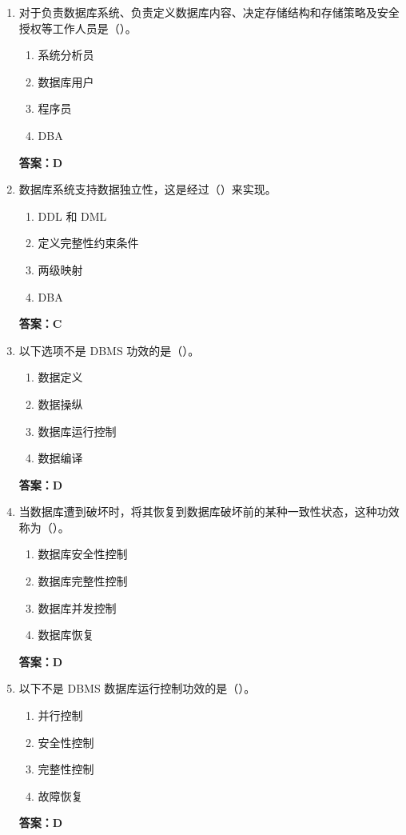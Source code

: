 \documentclass[12pt, a4paper]{article}
\begin{document}
\begin{enumerate}[label=\arabic*.]
	\item 对于负责数据库系统、负责定义数据库内容、决定存储结构和存储策略及安全授权等工作人员是（\quad）。
	      \begin{enumerate}
		      \item 系统分析员
		      \item 数据库用户
		      \item 程序员
		      \item DBA
	      \end{enumerate}
	      \textbf{答案：D}

	\item 数据库系统支持数据独立性，这是经过（\quad）来实现。
	      \begin{enumerate}
		      \item DDL 和 DML
		      \item 定义完整性约束条件
		      \item 两级映射
		      \item DBA
	      \end{enumerate}
	      \textbf{答案：C}

	\item 以下选项不是 DBMS 功效的是（\quad）。
	      \begin{enumerate}
		      \item 数据定义
		      \item 数据操纵
		      \item 数据库运行控制
		      \item 数据编译
	      \end{enumerate}
	      \textbf{答案：D}

	\item 当数据库遭到破坏时，将其恢复到数据库破坏前的某种一致性状态，这种功效称为（\quad）。
	      \begin{enumerate}
		      \item 数据库安全性控制
		      \item 数据库完整性控制
		      \item 数据库并发控制
		      \item 数据库恢复
	      \end{enumerate}
	      \textbf{答案：D}

	\item 以下不是 DBMS 数据库运行控制功效的是（\quad）。
	      \begin{enumerate}
		      \item 并行控制
		      \item 安全性控制
		      \item 完整性控制
		      \item 故障恢复
	      \end{enumerate}
	      \textbf{答案：D}


\end{enumerate}
\end{document}
